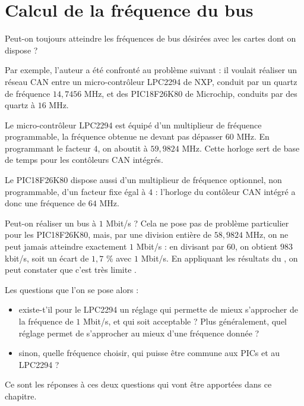 

\chapter{Calcul de la fréquence du bus}

\thispagestyle{empty}

Peut-on toujours atteindre les fréquences de bus désirées avec les cartes dont on dispose ?

Par exemple, l'auteur a été confronté au problème suivant : il voulait réaliser un réseau CAN entre un micro-contrôleur LPC2294 de NXP, conduit par un quartz de fréquence $14,7456$ MHz, et des PIC18F26K80 de Microchip, conduits par des quartz à $16$ MHz.

Le micro-contrôleur LPC2294 est équipé d'un multiplieur de fréquence programmable, la fréquence obtenue ne devant pas dépasser $60$ MHz. En programmant le facteur $4$, on aboutit à $59,9824$ MHz. Cette horloge sert de base de temps pour les contôleurs CAN intégrés. 

Le PIC18F26K80 dispose aussi d'un multiplieur de fréquence optionnel, non programmable, d'un facteur fixe égal à $4$ : l'horloge du contôleur CAN intégré a donc une fréquence de $64$ MHz.

Peut-on réaliser un bus à $1$ Mbit/s ? Cela ne pose pas de problème particulier pour les PIC18F26K80, mais, par une division entière de $58,9824$ MHz, on ne peut jamais atteindre exactement $1$ Mbit/s : en divisant par $60$, on obtient $983$ kbit/s, soit un écart de $1,7$ \% avec $1$ Mbit/s. En appliquant les résultats du , on peut constater que c'est très limite \pasFini.

Les questions que l'on se pose alors :
\begin{itemize}
  \item existe-t'il pour le LPC2294 un réglage qui permette de mieux s'approcher de la fréquence de $1$ Mbit/s, et qui soit acceptable ? Plus généralement, quel réglage permet de s'approcher au mieux d'une fréquence donnée ?
  \item sinon, quelle fréquence choisir, qui puisse être commune aux PICs et au LPC2294 ?
\end{itemize}

Ce sont les réponses à ces deux questions qui vont être apportées dans ce chapitre.

